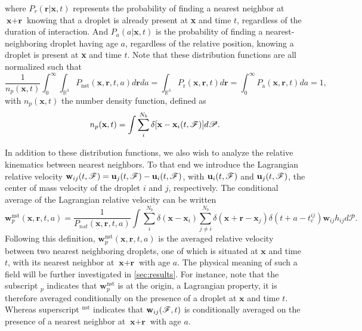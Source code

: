 where $P_r(\textbf{r}|\textbf{x},t)$ represents the probability of finding a nearest neighbor at $\textbf{x}+\textbf{r}$ knowing that a droplet is already present at \textbf{x} and time $t$, regardless of the duration of interaction. 
And $P_a(a|\textbf{x},t)$ is the probability of finding a nearest-neighboring droplet having age $a$, regardless of the relative position, knowing a droplet is present at \textbf{x} and time $t$. 
Note that these distribution functions are all normalized such that 
\begin{equation}
    \frac{1}{n_p(\textbf{x},t)}\int_0^\infty \int_{\mathbb{R}^3} P_\text{nst}(\textbf{x},\textbf{r},t,a) d\textbf{r} da 
    = 
    \int_{\mathbb{R}^3} P_\text{r}(\textbf{x},\textbf{r},t) d\textbf{r} 
    = \int_0^\infty P_\text{a}(\textbf{x},\textbf{r},t) da 
    = 1,
    \label{eq:norm}
\end{equation}
with $n_p(\textbf{x},t)$ the number density function, defined as
\begin{equation}
    n_p(\textbf{x},t)= 
    \int \sum_{i}^{N_b}\delta[\textbf{x}-\textbf{x}_i(t,\FF)] d\mathscr{P}.
    \label{eq:n_p}
\end{equation}


In addition to these distribution functions, we also wish to analyze the relative kinematics   between nearest neighbors. 
To that end we introduce the Lagrangian relative velocity $\textbf{w}_{ij}(t,\mathscr{F}) = \textbf{u}_j(t,\mathscr{F}) - \textbf{u}_i(t,\mathscr{F})$, with $\textbf{u}_i(t,\mathscr{F})$ and $\textbf{u}_j(t,\mathscr{F})$, the center of mass velocity of the droplet $i$ and $j$, respectively.
The conditional average of the Lagrangian relative velocity can be written
\begin{equation*}
    \textbf{w}^\text{nst}_p (\textbf{x},\textbf{r},t,a)
    = 
    \frac{1}{P_{nst}(\textbf{x},\textbf{r},t,a)}
    \int \sum_{i}^{N_b}\delta(\textbf{x}-\textbf{x}_i)
    \sum_{j\neq i}^{N_b}\delta(\textbf{x}+\textbf{r}-\textbf{x}_j) 
    \delta(t+a-t_c^{ij}) 
    \textbf{w}_{ij}
    h_{ij} 
    d\mathscr{P}.
    \label{eq:q_nstij}
\end{equation*}
Following this definition, $\textbf{w}^\text{nst}_p(\textbf{x},\textbf{r},t,a)$ is the averaged relative velocity between two nearest neighboring droplets, one of which is situated at $\textbf{x}$ and time $t$, with its nearest neighbor at $\textbf{x}+\textbf{r}$ with age $a$. 
The physical meaning of such a field will be further investigated in \ref{sec:results}. 
For instance, note that the subscript $_p$ indicates that $\textbf{w}^\text{nst}_p$ is at the origin, a Lagrangian property, it is therefore averaged conditionally on the presence of a droplet at $\textbf{x}$ and time $t$. 
Whereas superscript $^\text{nst}$ indicates that $\textbf{w}_{ij}(\mathscr{F},t)$ is conditionally averaged on the presence of a nearest neighbor at $\textbf{x}+\textbf{r}$ with age $a$. 

